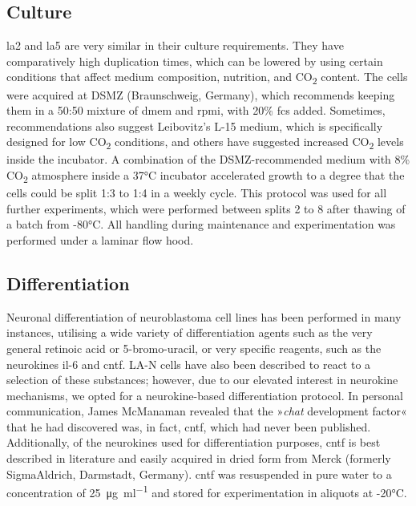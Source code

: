 \begin{method}

\subsection{Culture}

\ac{la2} and \ac{la5} are very similar in their culture requirements. They have comparatively high duplication times, which can be lowered by using certain conditions that affect medium composition, nutrition, and CO\textsubscript{2} content. The cells were acquired at DSMZ (Braunschweig, Germany), which recommends keeping them in a 50:50 mixture of \ac{dmem} and \ac{rpmi}, with 20\% \ac{fcs} added. Sometimes, recommendations also suggest Leibovitz's L-15 medium, which is specifically designed for low CO\textsubscript{2} conditions, and others have suggested increased CO\textsubscript{2} levels inside the incubator. A combination of the DSMZ-recommended medium with 8\% CO\textsubscript{2} atmosphere inside a 37°C incubator accelerated growth to a degree that the cells could be split 1:3 to 1:4 in a weekly cycle. This protocol was used for all further experiments, which were performed between splits 2 to 8 after thawing of a batch from -80°C. All handling during maintenance and experimentation was performed under a laminar flow hood.

\subsection{Differentiation}

Neuronal differentiation of neuroblastoma cell lines has been performed in many instances, utilising a wide variety of differentiation agents such as the very general retinoic acid or 5-bromo-uracil, or very specific reagents, such as the neurokines \ac{il}-6 and \ac{cntf}.\cite{Crosland1996} LA-N cells have also been described to react to a selection of these substances; however, due to our elevated interest in neurokine mechanisms, we opted for a neurokine-based differentiation protocol. In personal communication, James McManaman revealed that the »\textit{\ac{chat}} development factor« that he had discovered\cite{McManaman1988} was, in fact, \ac{cntf}, which had never been published. Additionally, of the neurokines used for differentiation purposes, \ac{cntf} is best described in literature and easily acquired in dried form from Merck (formerly SigmaAldrich, Darmstadt, Germany). \ac{cntf} was resuspended in pure water to a concentration of \SI{25}{\micro\gram\per\milli\litre} and stored for experimentation in aliquots at -20°C.


\end{method}
